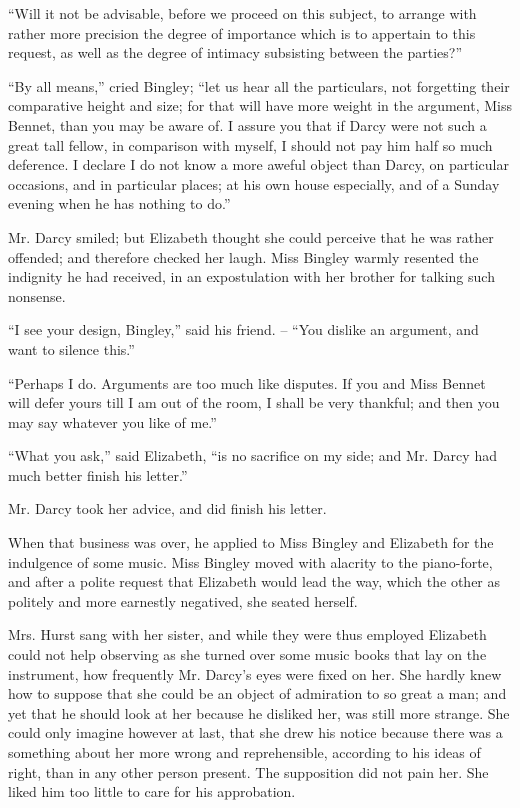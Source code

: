 “Will it not be advisable, before we proceed on this
subject, to arrange with rather more precision the degree
of importance which is to appertain to this request, as well
as the degree of intimacy subsisting between the parties?”

“By all means,” cried Bingley; “let us hear all the
particulars, not forgetting their comparative height and
size; for that will have more weight in the argument,
Miss Bennet, than you may be aware of. I assure you
that if Darcy were not such a great tall fellow, in comparison
with myself, I should not pay him half so much
deference. I declare I do not know a more aweful object
than Darcy, on particular occasions, and in particular
places; at his own house especially, and of a Sunday
evening when he has nothing to do.”

Mr. Darcy smiled; but Elizabeth thought she could
perceive that he was rather offended; and therefore
checked her laugh. Miss Bingley warmly resented the
indignity he had received, in an expostulation with her
brother for talking such nonsense.

“I see your design, Bingley,” said his friend. -- “You
dislike an argument, and want to silence this.”

“Perhaps I do. Arguments are too much like disputes.
If you and Miss Bennet will defer yours till I am out of
the room, I shall be very thankful; and then you may
say whatever you like of me.”

“What you ask,” said Elizabeth, “is no sacrifice on
my side; and Mr. Darcy had much better finish his letter.”

Mr. Darcy took her advice, and did finish his letter.

When that business was over, he applied to Miss Bingley
and Elizabeth for the indulgence of some music. Miss
Bingley moved with alacrity to the piano-forte, and after
a polite request that Elizabeth would lead the way, which
the other as politely and more earnestly negatived, she
seated herself.

Mrs. Hurst sang with her sister, and while they were
thus employed Elizabeth could not help observing as she
turned over some music books that lay on the instrument,
how frequently Mr. Darcy’s eyes were fixed on her. She
hardly knew how to suppose that she could be an object
of admiration to so great a man; and yet that he should
look at her because he disliked her, was still more strange.
She could only imagine however at last, that she drew
his notice because there was a something about her more
wrong and reprehensible, according to his ideas of right,
than in any other person present. The supposition did
not pain her. She liked him too little to care for his
approbation.

